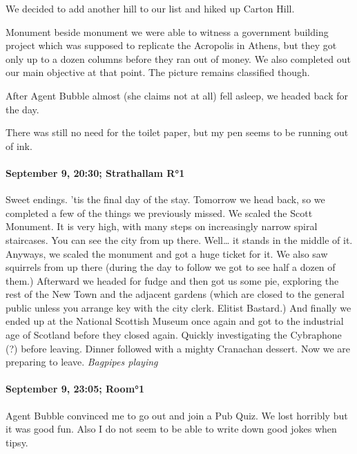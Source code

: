 We decided to add another hill to our list and hiked up Carton Hill.

Monument beside monument we were able to witness a government building project which was supposed to replicate the Acropolis in Athens, but they got only up to a dozen columns before they ran out of money.
We also completed out our main objective at that point.
The picture remains classified though.

After Agent Bubble almost (she claims not at all) fell asleep, we headed back for the day.

There was still no need for the toilet paper, but my pen seems to be running out of ink.

\paragraph{September 9, 20:30; Strathallam R°1}
Sweet endings.
'tis the final day of the stay.
Tomorrow we head back, so we completed a few of the things we previously missed.
We scaled the Scott Monument.
It is very high, with many steps on increasingly narrow spiral staircases.
You can see the city from up there.
Well\ldots{} it stands in the middle of it.
Anyways, we scaled the monument and got a huge ticket for it.
We also saw squirrels from up there (during the day to follow we got to see half a dozen of them.)
Afterward we headed for fudge and then got us some pie, exploring the rest of the New Town and the adjacent gardens (which are closed to the general public unless you arrange key with the city clerk. Elitist Bastard.)
And finally we ended up at the National Scottish Museum once again and got to the industrial age of Scotland before they closed again.
Quickly investigating the Cybraphone (?) before leaving.
Dinner followed with a mighty Cranachan dessert.
Now we are preparing to leave.
\emph{Bagpipes playing}

\paragraph{September 9, 23:05; Room°1}
Agent Bubble convinced me to go out and join a Pub Quiz.
We lost horribly but it was good fun.
Also I do not seem to be able to write down good jokes when tipsy.


